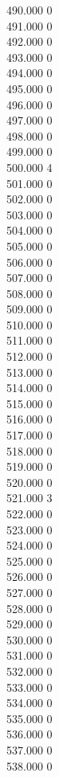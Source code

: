 { 490.000	0 \\
 491.000	0 \\
 492.000	0 \\
 493.000	0 \\
 494.000	0 \\
 495.000	0 \\
 496.000	0 \\
 497.000	0 \\
 498.000	0 \\
 499.000	0 \\
 500.000	4 \\
 501.000	0 \\
 502.000	0 \\
 503.000	0 \\
 504.000	0 \\
 505.000	0 \\
 506.000	0 \\
 507.000	0 \\
 508.000	0 \\
 509.000	0 \\
 510.000	0 \\
 511.000	0 \\
 512.000	0 \\
 513.000	0 \\
 514.000	0 \\
 515.000	0 \\
 516.000	0 \\
 517.000	0 \\
 518.000	0 \\
 519.000	0 \\
 520.000	0 \\
 521.000	3 \\
 522.000	0 \\
 523.000	0 \\
 524.000	0 \\
 525.000	0 \\
 526.000	0 \\
 527.000	0 \\
 528.000	0 \\
 529.000	0 \\
 530.000	0 \\
 531.000	0 \\
 532.000	0 \\
 533.000	0 \\
 534.000	0 \\
 535.000	0 \\
 536.000	0 \\
 537.000	0 \\
 538.000	0 \\
}
